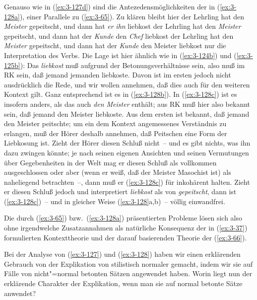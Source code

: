 \documentclass[output=paper]{langsci/langscibook}
\begin{document}
Genauso wie in (\ref{ex:3-127d}) sind die Antezedensmöglichkeiten der 
in (\ref{ex:3-128a}), einer Parallele zu (\ref{ex:3-65}). Zu klären bleibt hier
\eal
\label{ex:3-128}
\ex
\label{ex:3-128a}
der Lehrling hat den \textit{Meister} gepeitscht, und dann hat \textit{er} \textit{ihn} liebkost
\ex
\label{ex:3-128b}
der Lehrling hat den \textit{Meister} gepeitscht, und dann hat der \textit{Kunde} den \textit{Chef} liebkost
\ex
\label{ex:3-128c}
der Lehrling hat den \textit{Meister} gepeitscht, und dann hat der \textit{Kunde} den Meister liebkost
\zl
nur die Interpretation des Verbs. Die Lage ist hier ähnlich wie in
(\ref{ex:3-124b}) und (\ref{ex:3-125b}): Das  \textit{liebkost} muß aufgrund der
Betonungsverhältnisse  sein, also muß im RK sein, daß jemand
jemanden liebkoste. Davon ist im ersten  jedoch nicht
ausdrücklich die Rede, und wir wollen annehmen, daß dies auch für den
weiteren Kontext gilt. Ganz entsprechend ist es in (\ref{ex:3-128b}). In (\ref{ex:3-128c}) ist es insofern anders, als das  auch \textit{den Meister}
enthält; aus RK muß hier also bekannt sein, daß jemand den Meister
liebkoste. Aus dem ersten  ist bekannt, daß jemand den Meister
peitschte; um ein dem Kontext angemessenes Verständnis zu erlangen,
muß der Hörer deshalb annehmen, daß Peitschen eine Form der Liebkosung
ist. Zieht der Hörer diesen Schluß nicht~-- und es gibt nichts, was
ihn dazu zwingen könnte; je nach seinen eigenen Ansichten und seinen
Vermutungen über Gegebenheiten in der Welt mag er diesen Schluß als
vollkommen ausgeschlossen oder aber (\zb wenn er weiß, daß der
Meister Masochist ist) als naheliegend betrachten~--, dann muß er (\ref{ex:3-128c}) für inkohärent halten. Zieht er diesen Schluß jedoch und
interpretiert \textit{liebkost} als  von \textit{gepeitscht},
dann ist (\ref{ex:3-128c})~-- und in gleicher Weise (\ref{ex:3-128}a,b)~-- völlig
einwandfrei.

Die durch (\ref{ex:3-65}) bzw.\ (\ref{ex:3-128a}) präsentierten Probleme lösen sich also
ohne irgendwelche Zusatzannahmen als natürliche Konsequenz der in (\ref{ex:3-37})
formulierten Kontexttheorie und der darauf basierenden Theorie der
 (\ref{ex:3-66}).

Bei der Analyse von (\ref{ex:3-127}) und (\ref{ex:3-128}) haben wir einen erklärenden
Gebrauch von der Explikation von stilistisch normaler 
gemacht, indem wir sie auf Fälle von nicht"=normal betonten Sätzen
angewendet haben. Worin liegt nun der erklärende Charakter der
Explikation, wenn man sie auf normal betonte Sätze anwendet?
\end{document}
